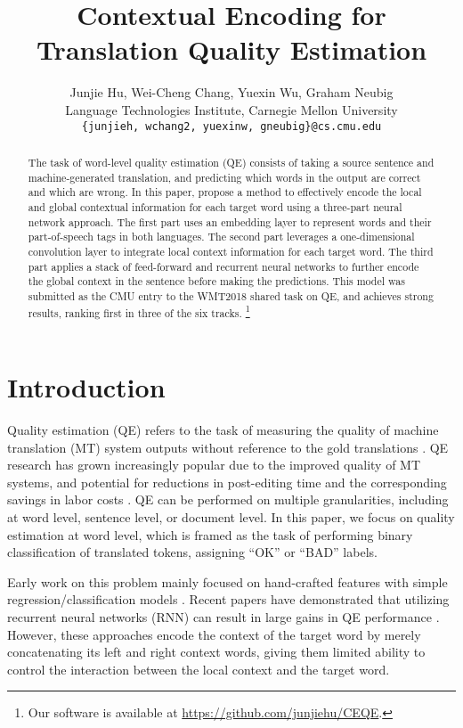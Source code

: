 \documentclass[11pt,a4paper]{article}
\title{Contextual Encoding for Translation Quality Estimation}
\author{Junjie Hu, Wei-Cheng Chang, Yuexin Wu, Graham Neubig \\
  Language Technologies Institute, Carnegie Mellon University \\
  {\tt \{junjieh, wchang2, yuexinw, gneubig\}@cs.cmu.edu} }
\date{}
\begin{document}
\maketitle
\begin{abstract}
  The task of word-level quality estimation (QE) consists of taking a source sentence and machine-generated translation, and predicting which words in the output are correct and which are wrong.
  In this paper, propose a method to effectively encode the local and global contextual information for each target word using a three-part neural network approach.
  The first part uses an embedding layer to represent words and their part-of-speech tags in both languages. The second part leverages a one-dimensional convolution layer to integrate local context information for each target word. The third part applies a stack of feed-forward and recurrent neural networks to further encode the global context in the sentence before making the predictions. This model was submitted as the CMU entry to the WMT2018 shared task on QE, and achieves strong results, ranking first in three of the six tracks.%
\footnote{Our software is available at \url{https://github.com/junjiehu/CEQE}. } 
\end{abstract}

\section{Introduction}


Quality estimation (QE) refers to the task of measuring the quality of machine translation (MT) system outputs without reference to the gold translations \cite{blatz2004confidence,specia2013quest}.
QE research has grown increasingly popular due to the improved quality of MT systems, and potential for reductions in post-editing time and the corresponding savings in labor costs \cite{specia2011exploiting,turchi2014adaptive}.
QE can be performed on multiple granularities, including at word level, sentence level, or document level.
In this paper, we focus on quality estimation at word level, which is framed as the task of performing binary classification of translated tokens, assigning ``OK'' or ``BAD'' labels. 

Early work on this problem mainly focused on hand-crafted features with simple regression/classification models \cite{ueffing2007word,biccici2013referential}.
Recent papers have demonstrated that utilizing recurrent neural networks (RNN) can result in large gains in QE performance \cite{TACL1113}.
However, these approaches encode the context of the target word by merely concatenating its left and right context words, giving them limited ability to control the interaction between the local context and the target word. 
\end{document}
